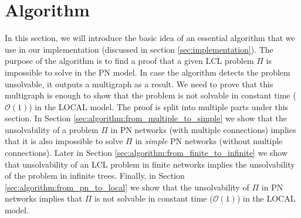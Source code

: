 
\section{Algorithm} \label{sec:algorithm}


%
%
%




In this section, we will introduce the basic idea of an essential algorithm that we use in our implementation (discussed in section \ref{sec:implementation}).
The purpose of the algorithm is to find a proof that a given LCL problem $\Pi$ is impossible to solve in the PN model.
In case the algorithm detects the problem unsolvable, it outputs a multigraph as a result.
We need to prove that this multigraph is enough to show that the problem is not solvable in constant time ($\mathcal{O}(1)$) in the LOCAL model.
The proof is split into multiple parts under this section.
In Section \ref{sec:algorithm:from_multiple_to_simple} we show that the unsolvability of a problem $\Pi$ in PN networks (with multiple connections) implies that it is also impossible to solve $\Pi$ in \emph{simple} PN networks (without multiple connections).
Later in Section \ref{sec:algorithm:from_finite_to_infinite} we show that unsolvability of an LCL problem in finite networks implies the unsolvability of the problem in infinite trees.
Finally, in Section \ref{sec:algorithm:from_pn_to_local} we show that the unsolvability of $\Pi$ in PN networks implies that $\Pi$ is not solvable in constant time ($\mathcal{O}(1)$) in the LOCAL model.

